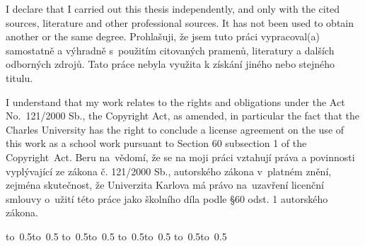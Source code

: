\ifEN
\noindent
I declare that I carried out this \ThesisAccusative thesis independently, and only with the cited
sources, literature and other professional sources. It has not been used to obtain another
or the same degree.
\else
\noindent
Prohlašuji, že jsem tuto \ThesisAccusative práci vypracoval(a) samostatně a výhradně
s~použitím citovaných pramenů, literatury a dalších odborných zdrojů.
Tato práce nebyla využita k získání jiného nebo stejného titulu.
\fi

\ifEN
\medskip\noindent
I understand that my work relates to the rights and obligations under the Act No.~121/2000 Sb.,
the Copyright Act, as amended, in particular the fact that the Charles
University has the right to conclude a license agreement on the use of this
work as a school work pursuant to Section 60 subsection 1 of the Copyright~Act.
\else
\medskip\noindent
Beru na~vědomí, že se na moji práci vztahují práva a povinnosti vyplývající
ze zákona č. 121/2000 Sb., autorského zákona v~platném znění, zejména skutečnost,
že Univerzita Karlova má právo na~uzavření licenční smlouvy o~užití této
práce jako školního díla podle §60 odst. 1 autorského zákona.
\fi

\vspace{10mm}


\ifEN
\hbox{\hbox to 0.5\hbox to 0.5\hsize{\dotfill\quad}}
\smallskip
\hbox{\hbox to 0.5\hsize{}\hbox to 0.5}
\else
\hbox{\hbox to 0.5\hbox to 0.5\hsize{\dotfill\quad}}
\smallskip
\hbox{\hbox to 0.5\hsize{}\hbox to 0.5}
\fi

\vspace{20mm}
\newpage


\openright

\noindent
\Dedication

\newpage


\openright

